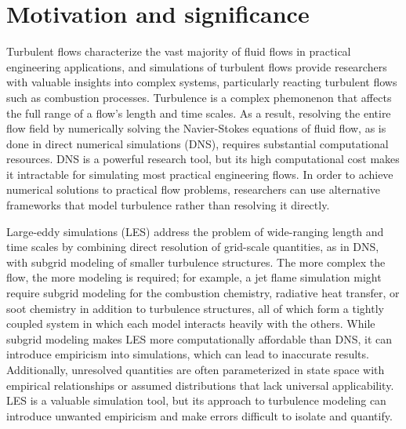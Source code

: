\documentclass[preprint,12pt, a4paper]{elsarticle}
\begin{document}
\section{Motivation and significance}
\label{sec:motivation}

Turbulent flows characterize the vast majority of fluid flows in practical engineering applications, and simulations of turbulent flows provide researchers with valuable insights into complex systems, particularly reacting turbulent flows such as combustion processes. Turbulence is a complex phemonenon that affects the full range of a flow's length and time scales. As a result, resolving the entire flow field by numerically solving the Navier-Stokes equations of fluid flow, as is done in direct numerical simulations (DNS), requires substantial computational resources. DNS is a powerful research tool, but its high computational cost makes it intractable for simulating most practical engineering flows. In order to achieve numerical solutions to practical flow problems, researchers can use alternative frameworks that model turbulence rather than resolving it directly.

Large-eddy simulations (LES) address the problem of wide-ranging length and time scales by combining  direct resolution of grid-scale quantities, as in DNS, with subgrid modeling of smaller turbulence structures. The more complex the flow, the more modeling is required; for example, a jet flame simulation might require subgrid modeling for the combustion chemistry, radiative heat transfer, or soot chemistry in addition to turbulence structures, all of which form a tightly coupled system in which each model interacts heavily with the others. While subgrid modeling makes LES more computationally affordable than DNS, it can introduce empiricism into simulations, which can lead to inaccurate results. Additionally, unresolved quantities are often parameterized in state space with empirical relationships or assumed distributions that lack universal applicability. LES is a valuable simulation tool, but its approach to turbulence modeling can introduce unwanted empiricism and make errors difficult to isolate and quantify.
\end{document}

